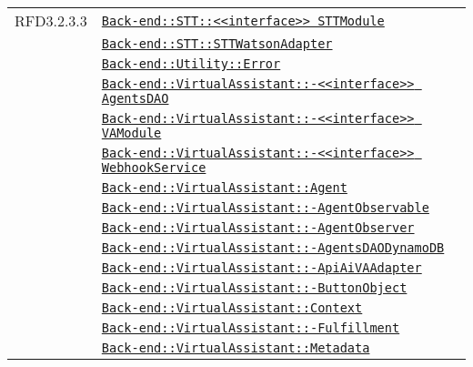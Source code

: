 \begin{longtable}{|>{\centering}m{3cm}|m{10cm}<{\centering}|}
RFD3.2.3.3 & \hyperref[Back-end::STT::<<interface>> STTModule]{\texttt{Back-end::STT::<<interface>> STTModule}}\\
& \hyperref[Back-end::STT::STTWatsonAdapter]{\texttt{Back-end::STT::STTWatsonAdapter}}\\
& \hyperref[Back-end::Utility::Error]{\texttt{Back-end::Utility::Error}}\\
& \hyperref[Back-end::VirtualAssistant::<<interface>> AgentsDAO]{\texttt{Back-end::VirtualAssistant::-\linebreak <<interface>> AgentsDAO}}\\
& \hyperref[Back-end::VirtualAssistant::<<interface>> VAModule]{\texttt{Back-end::VirtualAssistant::-\linebreak <<interface>> VAModule}}\\
& \hyperref[Back-end::VirtualAssistant::<<interface>> WebhookService]{\texttt{Back-end::VirtualAssistant::-\linebreak <<interface>> WebhookService}}\\
& \hyperref[Back-end::VirtualAssistant::Agent]{\texttt{Back-end::VirtualAssistant::Agent}}\\
& \hyperref[Back-end::VirtualAssistant::AgentObservable]{\texttt{Back-end::VirtualAssistant::-\linebreak AgentObservable}}\\
& \hyperref[Back-end::VirtualAssistant::AgentObserver]{\texttt{Back-end::VirtualAssistant::-\linebreak AgentObserver}}\\
& \hyperref[Back-end::VirtualAssistant::AgentsDAODynamoDB]{\texttt{Back-end::VirtualAssistant::-\linebreak AgentsDAODynamoDB}}\\
& \hyperref[Back-end::VirtualAssistant::ApiAiVAAdapter]{\texttt{Back-end::VirtualAssistant::-\linebreak ApiAiVAAdapter}}\\
& \hyperref[Back-end::VirtualAssistant::ButtonObject]{\texttt{Back-end::VirtualAssistant::-\linebreak ButtonObject}}\\
& \hyperref[Back-end::VirtualAssistant::Context]{\texttt{Back-end::VirtualAssistant::Context}}\\
& \hyperref[Back-end::VirtualAssistant::Fulfillment]{\texttt{Back-end::VirtualAssistant::-\linebreak Fulfillment}}\\
& \hyperref[Back-end::VirtualAssistant::Metadata]{\texttt{Back-end::VirtualAssistant::Metadata}}\\

\end{longtable}
